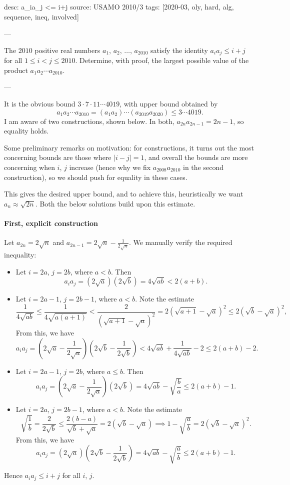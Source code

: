 desc: a_ia_j <= i+j
source: USAMO 2010/3
tags: [2020-03, oly, hard, alg, sequence, ineq, involved]

---

The $2010$ positive real numbers $a_1$, $a_2$, $\ldots$, $a_{2010}$ satisfy the identity $a_ia_j\le i+j$ for all $1\le i<j\le2010$. Determine, with proof, the largest possible value of the product $a_1a_2\cdots a_{2010}$.

---

It is the obvious bound $3\cdot7\cdot11\cdots4019$, with upper bound obtained by \[a_1a_2\cdots a_{2010}=(a_1a_2)\cdots(a_{2019}a_{2020})\le3\cdots4019.\]
I am aware of two constructions, shown below. In both, $a_{2n}a_{2n-1}=2n-1$, so equality holds.
\begin{remark}
    Some preliminary remarks on motivation: for constructions, it turns out the most concerning bounds are those where $|i-j|=1$, and overall the bounds are more concerning when $i$, $j$ increase (hence why we fix $a_{2008}a_{2010}$ in the second construction), so we should push for equality in these cases.

    This gives the desired upper bound, and to achieve this, heuristically we want $a_n\approx\sqrt{2n}$. Both the below solutions build upon this estimate.
\end{remark}
\paragraph{First, explicit construction}     Let $a_{2n}=2\sqrt n$ and $a_{2n-1}=2\sqrt n-\frac1{2\sqrt n}$. We manually verify the required inequality:
\begin{itemize}
    \item Let $i=2a$, $j=2b$, where $a<b$. Then \[a_ia_j=\left(2\sqrt a\right)\left(2\sqrt b\right)=4\sqrt{ab}<2(a+b).\]
    \item Let $i=2a-1$, $j=2b-1$, where $a<b$. Note the estimate
        \[\frac1{4\sqrt{ab}}\le\frac1{4\sqrt{a(a+1)}}<\frac2{\left(\sqrt{a+1}-\sqrt a\right)^2}=2\left(\sqrt{a+1}-\sqrt a\right)^2\le2\left(\sqrt b-\sqrt a\right)^2,\]
        From this, we have \[a_ia_j=\left(2\sqrt a-\frac1{2\sqrt a}\right)\left(2\sqrt b-\frac1{2\sqrt b}\right)<4\sqrt{ab}+\frac1{4\sqrt{ab}}-2\le2(a+b)-2.\]
    \item Let $i=2a-1$, $j=2b$, where $a\le b$. Then \[a_ia_j=\left(2\sqrt a-\frac1{2\sqrt a}\right)\left(2\sqrt b\right)=4\sqrt{ab}-\sqrt{\frac ba}\le2(a+b)-1.\]
    \item Let $i=2a$, $j=2b-1$, where $a<b$. Note the estimate \[\sqrt{\frac1b}=\frac2{2\sqrt b}\le\frac{2(b-a)}{\sqrt b+\sqrt a}=2\left(\sqrt b-\sqrt a\right)\implies 1-\sqrt{\frac ab}=2\left(\sqrt b-\sqrt a\right)^2.\]
        From this, we have \[a_ia_j=\left(2\sqrt a\right)\left(2\sqrt b-\frac1{2\sqrt b}\right)=4\sqrt{ab}-\sqrt{\frac ab}\le2(a+b)-1.\]
\end{itemize}
Hence $a_ia_j\le i+j$ for all $i$, $j$.

